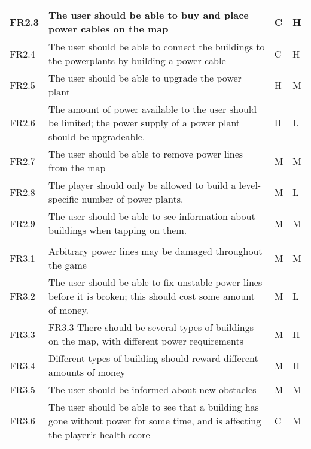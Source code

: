 \begin{longtable}{| p{1.5cm} | p{8cm} | p{1.5cm} | p{2cm} |}
      FR2.3 & The user should be able to buy and place power cables on the map & C & H \\ \hline

      FR2.4 & The user should be able to connect the buildings to the powerplants by building a power 
      cable & C & H \\ \hline

      FR2.5 & The user should be able to upgrade the power plant & H & M \\ \hline

      FR2.6 & The amount of power available to the user should be limited; the power supply of a 
      power plant should be upgradeable. & H & L \\ \hline

      FR2.7 & The user should be able to remove power lines from the map & M & M \\ \hline

      FR2.8 & The player should only be allowed to build a level-specific number of power plants. & M & L \\ \hline

      FR2.9 & The user should be able to see information about buildings when tapping on them. & M & M \\ \hline
   \pagebreak
   \hline
   \multicolumn{4}{|>{\columncolor[gray]{.8}}l|}{3) Obstacles} \\ \hline

      FR3.1 & Arbitrary power lines may be damaged throughout the game & M & M \\ \hline

      FR3.2 & The user should be able to fix unstable power lines before it is broken; 
      this should cost some amount of money. & M & L \\ \hline

      FR3.3 & FR3.3 There should be several types of buildings on the map, with different power 
      requirements & M & H \\ \hline

      FR3.4 & Different types of building should reward different amounts of money & 
      M & H \\ \hline

      FR3.5 & The user should be informed about new obstacles & M & M \\ \hline

      FR3.6 & The user should be able to see that a building has gone without power 
      for some time, and is affecting the player's health score & C & M \\ \hline


\end{longtable}
